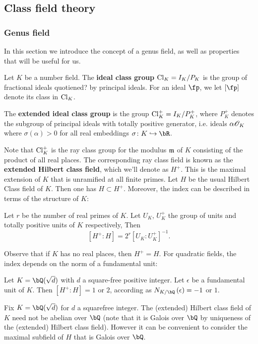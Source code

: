 \subsection{Class field theory}
\subsubsection{Genus field}

In this section we introduce the concept of a genus field, as well as properties that will be useful for us.

Let $K$ be a number field. The \textbf{ideal class group} $\mathrm{Cl}_K = I_K / P_K$ is the group of fractional ideals quotiened{\color{red}?} by principal ideals.
For an ideal $\fp$, we let $[\fp]$ denote its class in $\mathrm{Cl}_K$.

The \textbf{extended ideal class group} is the group $\mathrm{Cl}_K^{+} = I_K / P_K^{+}$, where
$P_K^{+}$ denotes the subgroup of principal ideals with totally positive generator, i.e. ideals $\alpha \mathcal{O}_K$ where $\sigma(\alpha) > 0$ for all real embeddings $\sigma \colon K \emb \bR$.

Note that $\mathrm{Cl}_K^{+}$ is the ray class group for the modulus $\mathfrak{m}$ of $K$ consisting of the product of all real places. The corresponding ray class field is known as the \textbf{extended Hilbert class field}, which we'll denote as $H^{+}$. This is the maximal extension of $K$ that is unramified at all finite primes. Let $H$ be the usual Hilbert Class field of $K$. Then one has $H \subset H^{+}$. Moreover, the index can be described in terms of the structure of $K$:

\begin{thm}
    Let $r$ be the number of real primes of $K$. Let $U_K$, $U_K^{+}$ the group of units and totally positive units of $K$ respectively, Then 
    \[ [H^{+} \colon H] = 2^r [U_K \colon U_K^{+}]^{-1} .\]
\end{thm}
Observe that if $K$ has no real places, then $H^{+} = H$. For quadratic fields, the index depends on the norm of a fundamental unit:

\begin{cor}
    Let $K = \bQ(\sqrt{d})$ with $d$ a square-free positive integer. Let $\epsilon$ be a fundamental unit of $K$. Then $[H^{+} \colon H] = 1$ or $2$, according as $N_{K / \bQ}\left(\epsilon\right) = -1$ or $1$. 
\end{cor}


Fix $K = \bQ(\sqrt{d})$ for $d$ a squarefree integer. The (extended) Hilbert class field of $K$ need not be abelian over $\bQ$ (note that it is Galois over $\bQ$ by uniqueness of the (extended) Hilbert class field). However it can be convenient to consider the maximal subfield of $H$ that is Galois over $\bQ$. 

